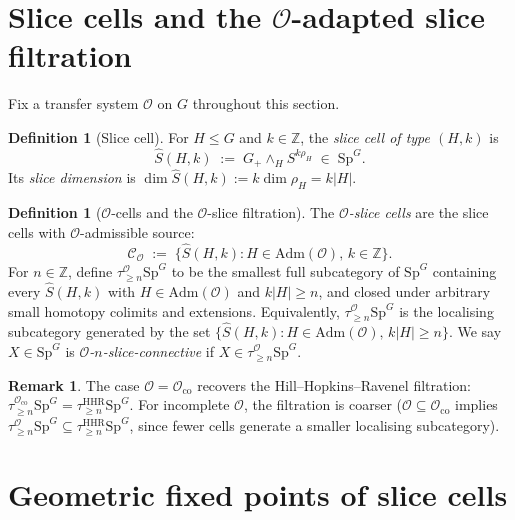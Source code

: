 \documentclass[12pt]{article}
\theoremstyle{definition}
\newtheorem{definition}[theorem]{Definition}
\newtheorem{remark}[theorem]{Remark}
\newcommand{\SpG}{\mathrm{Sp}^{G}}
\newcommand{\OO}{\mathcal{O}}
\newcommand{\ZZ}{\mathbb{Z}}
\newcommand{\admis}{\mathrm{Adm}}
\begin{document}
\section{Slice cells and the $\OO$-adapted slice filtration}\label{sec:filt}

Fix a transfer system $\OO$ on $G$ throughout this section.

\begin{definition}[Slice cell]\label{def:cell}
For $H\leq G$ and $k\in\ZZ$, the \emph{slice cell of type $(H,k)$} is
\[
\widehat{S}(H,k)\;:=\;G_{+}\wedge_{H}S^{k\rho_{H}}\;\in\;\SpG.
\]
Its \emph{slice dimension} is $\dim\widehat{S}(H,k):=k\dim\rho_{H}=k|H|$.
\end{definition}

\begin{definition}[$\OO$-cells and the $\OO$-slice filtration]\label{def:tauO}
The \emph{$\OO$-slice cells} are the slice cells with $\OO$-admissible source:
\[
\mathcal{C}_{\OO}\;:=\;\bigl\{\widehat{S}(H,k):H\in\admis(\OO),\,k\in\ZZ\bigr\}.
\]
For $n\in\ZZ$, define $\tau_{\geq n}^{\OO}\SpG$ to be the smallest full
subcategory of $\SpG$ containing every $\widehat{S}(H,k)$ with
$H\in\admis(\OO)$ and $k|H|\geq n$, and closed under arbitrary small homotopy
colimits and extensions. Equivalently, $\tau_{\geq n}^{\OO}\SpG$ is the
localising subcategory generated by the set
$\{\widehat{S}(H,k):H\in\admis(\OO),\,k|H|\geq n\}$. We say $X\in\SpG$ is
\emph{$\OO$-$n$-slice-connective} if $X\in\tau_{\geq n}^{\OO}\SpG$.
\end{definition}

\begin{remark}\label{rem:HHR-special}
The case $\OO=\OO_{\mathrm{co}}$ recovers the Hill--Hopkins--Ravenel
filtration: $\tau_{\geq n}^{\OO_{\mathrm{co}}}\SpG=\tau_{\geq
n}^{\mathrm{HHR}}\SpG$. For incomplete $\OO$, the filtration is coarser
($\OO\subseteq\OO_{\mathrm{co}}$ implies $\tau_{\geq
n}^{\OO}\SpG\subseteq\tau_{\geq n}^{\mathrm{HHR}}\SpG$, since fewer cells
generate a smaller localising subcategory).
\end{remark}

\section{Geometric fixed points of slice cells}\label{sec:cells-GF}
\end{document}
